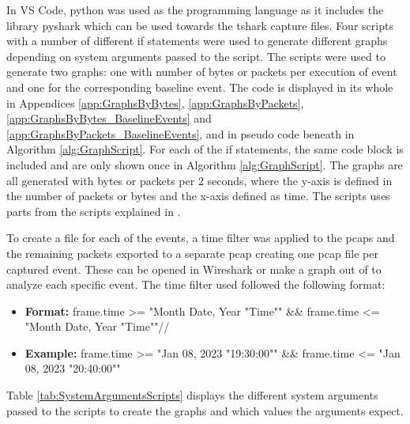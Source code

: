 In \gls{VS Code}, python was used as the programming language as it includes the library pyshark which can be used towards the tshark capture files. Four scripts with a number of different if statements were used to generate different graphs depending on system arguments passed to the script. The scripts were used to generate two graphs: one with number of bytes or packets per execution of event and one for the corresponding baseline event. The code is displayed in its whole in Appendices \ref{app:GraphsByBytes}, \ref{app:GraphsByPackets}, \ref{app:GraphsByBytes_BaselineEvents} and \ref{app:GraphsByPackets_BaselineEvents}, and in pseudo code beneath in Algorithm \ref{alg:GraphScript}. For each of the if statements, the same code block is included and are only shown once in Algorithm \ref{alg:GraphScript}. The graphs are all generated with bytes or packets per 2 seconds, where the y-axis is defined in the number of packets or bytes and the x-axis defined as time. The scripts uses parts from the scripts explained in \cite{GraphsInspiration}.

To create a file for each of the events, a time filter was applied to the pcaps and the remaining packets exported to a separate pcap creating one pcap file per captured event. These can be opened in Wireshark or make a graph out of to analyze each specific event. The time filter used followed the following format:

\begin{itemize}
\item \textbf{Format:} frame.time >= "Month Date, Year "Time"" \&\& frame.time <= "Month Date, Year "Time""//
\item \textbf{Example:} frame.time >= "Jan 08, 2023 "19:30:00"" \&\& frame.time <= "Jan 08, 2023 "20:40:00""
\end{itemize}

Table \ref{tab:SystemArgumentsScripts} displays the different system arguments passed to the scripts to create the graphs and which values the arguments expect. 

